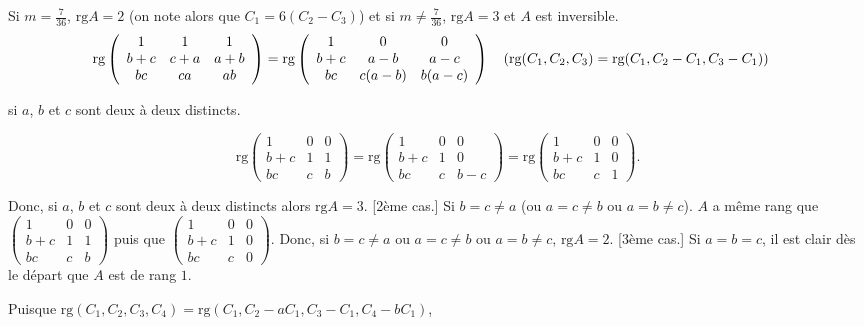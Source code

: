 {{Si $m=\frac{7}{36}$, $\mbox{rg}A=2$ (on note alors que $C_1=6(C_2-C_3)$) et si $m\neq\frac{7}{36}$, $\mbox{rg}A=3$ et $A$ est inversible.
\begin{align*}\ensuremath
\mbox{rg}\left(
\begin{array}{ccc}
1&1&1\\
b+c&c+a&a+b\\
bc&ca&ab
\end{array}
\right)&=\mbox{rg}\left(
\begin{array}{ccc}
1&0&0\\
b+c&a-b&a-c\\
bc&c(a-b)&b(a-c)
\end{array}
\right)\quad(\mbox{rg}(C_1,C_2,C_3)=\mbox{rg}(C_1,C_2-C_1,C_3-C_1))
\end{align*}

\begin{itemize}
[1er cas.] si $a$, $b$ et $c$ sont deux à deux distincts. 

$$\mbox{rg}\left(
\begin{array}{ccc}
1&0&0\\
b+c&1&1\\
bc&c&b
\end{array}
\right)=\mbox{rg}\left(
\begin{array}{ccc}
1&0&0\\
b+c&1&0\\
bc&c&b-c
\end{array}
\right)=\mbox{rg}\left(
\begin{array}{ccc}
1&0&0\\
b+c&1&0\\
bc&c&1
\end{array}
\right).$$

Donc, si $a$, $b$ et $c$ sont deux à deux distincts alors $\mbox{rg}A=3$.
[2ème cas.] Si $b=c\neq a$ (ou $a=c\neq b$ ou $a=b\neq c$).
$A$ a même rang que $\left(
\begin{array}{ccc}
1&0&0\\
b+c&1&1\\
bc&c&b
\end{array}
\right)$ puis que $\left(
\begin{array}{ccc}
1&0&0\\
b+c&1&0\\
bc&c&0
\end{array}
\right)$. Donc, si $b=c\neq a$ ou $a=c\neq b$ ou $a=b\neq c$, $\mbox{rg}A=2$.
[3ème cas.] Si $a=b=c$, il est clair dès le départ que $A$ est de rang $1$.
\end{itemize}
Puisque $\mbox{rg}(C_1,C_2,C_3,C_4)=\mbox{rg}(C_1,C_2-aC_1,C_3-C_1,C_4-bC_1)$,

}}
